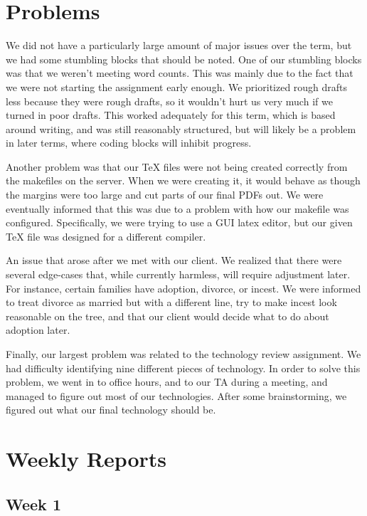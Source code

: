 \documentclass[onecolumn, draftclsnofoot, 10pt, compsoc]{IEEEtran}
\begin{document}
\section{Problems}
\begin{singlespace}
We did not have a particularly large amount of major issues over the term, but we had some stumbling blocks that should be noted.
One of our stumbling blocks was that we weren't meeting word counts. This was mainly due to the fact that we were not starting the assignment early enough. We prioritized rough drafts less because they were rough drafts, so it wouldn't hurt us very much if we turned in poor drafts. This worked adequately for this term, which is based around writing, and was still reasonably structured, but will likely be a problem in later terms, where coding blocks will inhibit progress.

Another problem was that our TeX files were not being created correctly from the makefiles on the server. When we were creating it, it would behave as though the margins were too large and cut parts of our final PDFs out. We were eventually informed that this was due to a problem with how our makefile was configured. Specifically, we were trying to use a GUI latex editor, but our given TeX file was designed for a different compiler.

An issue that arose after we met with our client. We realized that there were several edge-cases that, while currently harmless, will require adjustment later. For instance, certain families have adoption, divorce, or incest. We were informed to treat divorce as married but with a different line, try to make incest look reasonable on the tree, and that our client would decide what to do about adoption later.

Finally, our largest problem was related to the technology review assignment. We had difficulty identifying nine different pieces of technology. In order to solve this problem, we went in to office hours, and to our TA during a meeting, and managed to figure out most of our technologies. After some brainstorming, we figured out what our final technology should be.
\end{singlespace}

\section{Weekly Reports}
\subsection{Week 1}
\end{document}
